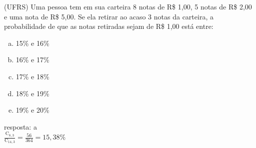 \begin{ex}
 (UFRS) Uma pessoa tem em sua carteira 8 notas de R\$ 1,00, 5  notas de 
R\$ 2,00 e uma nota de R\$ 5,00. Se ela retirar ao acaso 3 notas da carteira, a probabilidade de que as notas retiradas sejam de R\$ 1,00  está entre:
    \begin{enumerate}[(a)]
    \item 15\% e 16\%
    \item 16\% e 17\%
    \item 17\% e 18\%
    \item 18\% e 19\%
    \item 19\% e 20\%
    \end{enumerate}
      \begin{sol}
       resposta: a  \\
       $\frac{\mathrm{C}_{8,3}}{\mathrm{C}_{{14},3}}=\frac{56}{364}=15,38\%$
      \end{sol}
\end{ex}